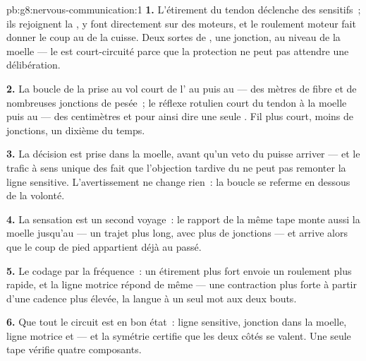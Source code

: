 \begin{solution}{pb:g8:nervous-communication:1}
\textbf{1.} L'étirement du tendon déclenche des  sensitifs~;
ils rejoignent la \emph{}, y font  directement
sur des  moteurs, et le roulement moteur fait donner le coup
au  de la cuisse. Deux sortes de , une jonction, au
niveau de la moelle --- le  est court-circuité parce que la
protection ne peut pas attendre une délibération.

\textbf{2.} La boucle de la prise au vol court de l' au 
puis au  --- des mètres de fibre et de nombreuses jonctions de
pesée~; le réflexe rotulien court du tendon à la moelle puis au
 --- des centimètres et pour ainsi dire une seule . Fil
plus court, moins de jonctions, un dixième du temps.

\textbf{3.} La décision est prise dans la moelle, avant qu'un veto
du  puisse arriver --- et le trafic à sens unique des
 fait que l'objection tardive du  ne peut pas
remonter la ligne sensitive. L'avertissement ne change rien~: la
boucle se referme en dessous de la volonté.

\textbf{4.} La sensation est un second voyage~: le rapport de la
même tape monte aussi la moelle jusqu'au  --- un trajet plus
long, avec plus de jonctions --- et arrive alors que le coup de pied
appartient déjà au passé.

\textbf{5.} Le codage par la fréquence~: un étirement plus fort
envoie un roulement plus rapide, et la ligne motrice répond de même
--- une contraction plus forte à partir d'une cadence plus élevée,
la langue à un seul mot aux deux bouts.

\textbf{6.} Que tout le circuit est en bon état~: ligne sensitive,
jonction dans la moelle, ligne motrice et  --- et la symétrie
certifie que les deux côtés se valent. Une seule tape vérifie quatre
composants.


\end{solution}
